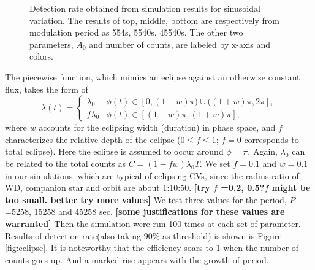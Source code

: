 \documentclass[twoside,twocolumn]{aastex63}
\begin{document}
\begin{figure}[htbp]
\caption{Detection rate obtained from simulation results for sinusoidal variation. The results of top, middle, bottom are respectively from modulation period as 554s, 5540s, 45540s. The other two parameters, $A_{0}$ and number of counts, are labeled by x-axis and colors. \label{fig:detection}}
\end{figure}

The piecewise function, which mimics an eclipse against an otherwise constant flux, takes the form of
\begin{equation}
\lambda(t)=
\begin{cases}
\lambda_0 & \text{$\phi(t) \in[0,(1-w)\pi)\cup ((1+w)\pi,2\pi]$},\\
f\lambda_0 & \text{$\phi(t) \in[(1-w)\pi,(1+w)\pi]$},
\end{cases}	
\end{equation}
where $w$ accounts for the eclipsing width (duration) in phase space, and $f$ characterizes the relative depth of the eclipse ($0\leq f \leq 1$; $f = 0$ corresponds to total eclipse). Here the eclipse is assumed to occur around $\phi = \pi$. 
Again, $\lambda_0$ can be related to the total counts as $C=(1-fw)\lambda_0T$.
We set $f=0.1$ and $w=0.1$ in our simulations, which are typical of eclipsing CVs, since the radius ratio of WD, companion star and orbit are about 1:10:50. {\bf [try $f$ =0.2, 0.5?$f$ might be too small. better try more values]}
We test three values for the period, $P$=5258, 15258 and 45258 sec. {\bf [some justifications for these values are warranted]} 
Then the simulation were run 100 times at each set of parameter. Results of detection rate(also taking 90\% as threshold) is shown is Figure \ref{fig:eclipse}. It is noteworthy that the efficiency soars to 1 when the number of counts goes up. And a marked rise appears with the growth of period.
 
\end{document}
